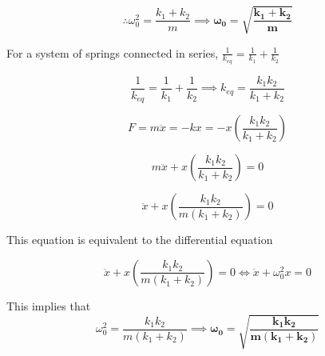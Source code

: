 \documentclass[12pt]{article}
\begin{document}
$$
\therefore \omega_0^2 = \frac{k_1 + k_2}{m} \implies \boldsymbol{\omega_0 = \sqrt{\frac{k_1 + k_2}{m}}}
$$

For a system of springs connected in series, $\frac{1}{k_{eq}} = \frac{1}{k_1} + \frac{1}{k_2}$

$$
\frac{1}{k_{eq}} = \frac{1}{k_1} + \frac{1}{k_2} \implies k_{eq} = \frac{k_1 k_2}{k_1 + k_2}
$$

$$
F = m \ddot{x} = -k x = - x (\frac{k_1 k_2}{k_1 + k_2})
$$

$$
m \ddot{x} + x (\frac{k_1 k_2}{k_1 + k_2}) = 0
$$

$$
\ddot{x} + x (\frac{k_1 k_2}{m(k_1 + k_2)}) = 0
$$

This equation is equivalent to the differential equation

$$
\ddot{x} + x (\frac{k_1 k_2}{m(k_1 + k_2)}) = 0 \Longleftrightarrow \ddot{x} + \omega_0^2 x = 0
$$

This implies that
$$
\omega_0^2 = \frac{k_1 k_2}{m(k_1 + k_2)} \implies \boldsymbol{\omega_0 = \sqrt{\frac{k_1 k_2}{m(k_1 + k_2)}}}
$$
\end{document}

